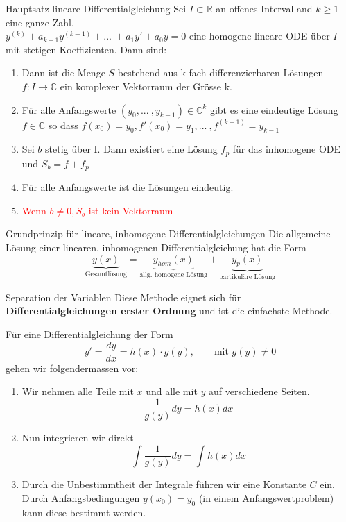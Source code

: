 \begin{Satz}{Hauptsatz lineare Differentialgleichung}{}
	Sei $I \subset \mathbb{R}$ an offenes Interval and $k \geq 1$ eine ganze Zahl,\\
	$y^{(k)} + a_{k-1}y^{(k-1)} +... \ + a_1y' + a_0 y = 0$ eine homogene lineare ODE über $I$ mit stetigen Koeffizienten.
	Dann sind: 
	\begin{enumerate}
		\item Dann ist die Menge $S$ bestehend aus k-fach differenzierbaren Lösungen $f: I \rightarrow \mathbb{C}$ ein komplexer Vektorraum der Grösse k.
		\item Für alle Anfangswerte $(y_0, ... \ , y_{k-1}) \in \mathbb{C}^k$ gibt es eine eindeutige Lösung $f \in \mathbb{C}$ so dass $f(x_0) = y_0, f'(x_0) = y_1, ... \ , f^{(k-1)} = y_{k-1}$
		\item Sei $b$ stetig über I. Dann existiert eine Lösung $f_p$ für das inhomogene ODE und $S_b = f + f_p$
		\item Für alle Anfangswerte ist die Lösungen eindeutig.
		\item \textcolor{red}{Wenn $b \neq 0, S_b$ ist kein Vektorraum} 
	\end{enumerate}
\end{Satz}
\begin{Satz}{Grundprinzip für lineare, inhomogene Differentialgleichungen}{}
    Die allgemeine Lösung einer linearen, inhomogenen Differentialgleichung hat die Form
    \[
        \underbrace{y(x)}_{\text{Gesamtlösung}}
        = \underbrace{y_{hom}(x)}_{\text{allg. homogene Lösung}}
        + \underbrace{y_p(x)}_{\text{partikuläre Lösung}}
    \]
\end{Satz}

\begin{Rezept}{Separation der Variablen}{}
	Diese Methode eignet sich für \textbf{Differentialgleichungen erster Ordnung} und ist die einfachste Methode.
	
	Für eine Differentialgleichung der Form
	\begin{equation*}
	y' =\frac{dy}{dx}= h(x)\cdot g(y), \qquad \text{mit } g(y)\neq 0
	\end{equation*}
	gehen wir folgendermassen vor:
	\begin{enumerate}
		\item Wir nehmen alle Teile mit $x$ und alle mit $y$ auf verschiedene Seiten.
		\begin{equation*}
		\frac{1}{g(y)} dy=h(x)dx
		\end{equation*}
		\item Nun integrieren wir direkt
		\begin{equation*}
		\int \frac{1}{g(y)}dy = \int h(x) dx
		\end{equation*}
		\item Durch die Unbestimmtheit der Integrale führen wir eine Konstante $C$ ein. Durch Anfangsbedingungen $y(x_0)=y_0$ (in einem Anfangswertproblem) kann diese bestimmt werden.
	\end{enumerate}
\end{Rezept}

